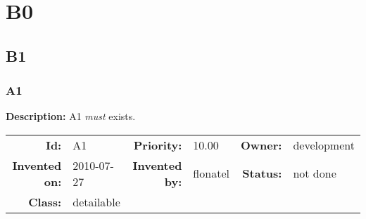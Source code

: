 \chapter{B0}
\section{B1}
\subsection{A1}\label{A1}
\textbf{Description:} A1 \textsl{must} exists.

\par
{\small \begin{center}\begin{tabular}{rlrlrl}
\textbf{Id:} & A1  & \textbf{Priority:} & 10.00  & \textbf{Owner:} & development\\ 
\textbf{Invented on:} & 2010-07-27  & \textbf{Invented by:} & flonatel  & \textbf{Status:} & not done \\ 
\textbf{Class:} & detailable  & & & \end{tabular}\end{center} }

